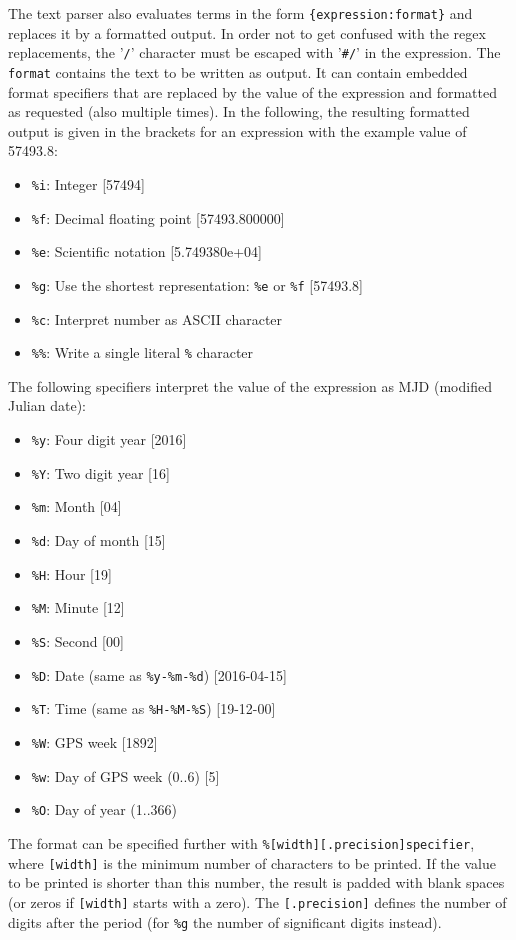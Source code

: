 The text parser also evaluates terms in the form \verb|{expression:format}| and replaces it by a formatted
output. In order not to get confused with the regex replacements, the '\verb|/|' character must be escaped
with '\verb|#/|' in the expression. The \verb|format| contains the text to be written as output.
It can contain embedded format specifiers that are replaced by the value of the expression and formatted
as requested (also multiple times). In the following, the resulting formatted output is given in the
brackets for an expression with the example value of 57493.8:
\begin{itemize}
\item \verb|%i|: Integer [57494]
\item \verb|%f|: Decimal floating point [57493.800000]
\item \verb|%e|: Scientific notation [5.749380e+04]
\item \verb|%g|: Use the shortest representation: \verb|%e| or \verb|%f| [57493.8]
\item \verb|%c|: Interpret number as ASCII character
\item \verb|%%|: Write a single literal \verb|%| character
\end{itemize}
The following specifiers interpret the value of the expression as MJD (modified Julian date):
\begin{itemize}
\item \verb|%y|: Four digit year [2016]
\item \verb|%Y|: Two digit year [16]
\item \verb|%m|: Month [04]
\item \verb|%d|: Day of month [15]
\item \verb|%H|: Hour [19]
\item \verb|%M|: Minute [12]
\item \verb|%S|: Second [00]
\item \verb|%D|: Date (same as \verb|%y-%m-%d|) [2016-04-15]
\item \verb|%T|: Time (same as \verb|%H-%M-%S|) [19-12-00]
\item \verb|%W|: GPS week [1892]
\item \verb|%w|: Day of GPS week (0..6) [5]
\item \verb|%O|: Day of year (1..366)
\end{itemize}
The format can be specified further with \verb|%[width][.precision]specifier|,
where \verb|[width]| is the minimum number of characters to be printed.
If the value to be printed is shorter than this number, the result is padded with blank spaces
(or zeros if \verb|[width]| starts with a zero).
The \verb|[.precision]| defines the number of digits after the period (for \verb|%g| the number of
significant digits instead).

